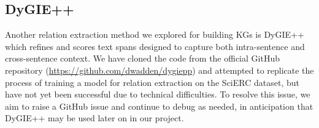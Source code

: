 \subsection*{DyGIE++} Another relation extraction method we explored for
building KGs is DyGIE++ which refines and scores text spans designed to capture
both intra-sentence and cross-sentence context. We have cloned the code from
the official GitHub repository (\url{https://github.com/dwadden/dygiepp}) and
attempted to replicate the process of training a model for relation extraction
on the SciERC dataset, but have not yet been successful due to technical
difficulties. To resolve this issue, we aim to raise a GitHub issue and
continue to debug as needed, in anticipation that DyGIE++ may be used later on
in our project.
